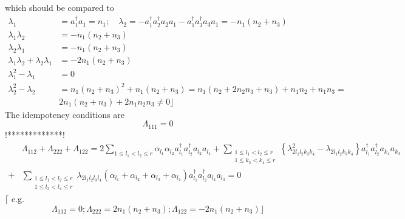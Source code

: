 \documentclass[aps,preprint]{revtex4}%
\begin{document}
which should be compared to
\begin{align}
\lambda_{1}  &  =a_{1}^{\dagger}a_{1}=n_{1};\quad\lambda_{2}=-a_{1}^{\dagger
}a_{2}^{\dagger}a_{2}a_{1}-a_{1}^{\dagger}a_{3}^{\dagger}a_{3}a_{1}%
=-n_{1}\left(  n_{2}+n_{3}\right) \nonumber\\
\lambda_{1}\lambda_{2}  &  =-n_{1}\left(  n_{2}+n_{3}\right) \nonumber\\
\lambda_{2}\lambda_{1}  &  =-n_{1}\left(  n_{2}+n_{3}\right) \nonumber\\
\lambda_{1}\lambda_{2}+\lambda_{2}\lambda_{1}  &  =-2n_{1}\left(  n_{2}%
+n_{3}\right) \nonumber\\
\lambda_{1}^{2}-\lambda_{1}  &  =0\nonumber\\
\lambda_{2}^{2}-\lambda_{2}  &  =n_{1}\left(  n_{2}+n_{3}\right)  ^{2}%
+n_{1}\left(  n_{2}+n_{3}\right)  =n_{1}\left(  n_{2}+2n_{2}n_{3}%
+n_{3}\right)  +n_{1}n_{2}+n_{1}n_{3}=\nonumber\\
&  2n_{1}\left(  n_{2}+n_{3}\right)  +2n_{1}n_{2}n_{3}\neq0\rfloor
\end{align}
The idempotency conditions are
\begin{equation}
\Lambda_{111}=0
\end{equation}
!*************!%
\begin{align}
&  \Lambda_{112}+\Lambda_{222}+\Lambda_{122}=2\sum_{1\leq l_{1}<l_{2}\leq
r}\alpha_{l_{1}}\alpha_{l_{2}}a_{l_{1}}^{\dagger}a_{l_{2}}^{\dagger}a_{l_{2}%
}a_{l_{1}}+\sum_{\substack{1\leq l_{1}<l_{2}\leq r\\1\leq k_{3}<k_{4}\leq
r}}\left\{  \lambda_{2l_{1}l_{2}k_{3}k_{4}}^{2}-\lambda_{2l_{1}l_{2}k_{3}%
k_{4}}\right\}  a_{l_{1}}^{\dagger}a_{l_{2}}^{\dagger}a_{k_{4}}a_{k_{3}}\\
+  &  \sum_{\substack{1\leq l_{1}<l_{2}\leq r\\1\leq l_{3}<l_{4}\leq
r}}\lambda_{2l_{1}l_{2}l_{3}l_{4}}\left(  \alpha_{l_{1}}+\alpha_{l_{2}}%
+\alpha_{l_{3}}+\alpha_{l_{4}}\right)  a_{l_{1}}^{\dagger}a_{l_{2}}^{\dagger
}a_{l_{4}}a_{l_{3}}=0
\end{align}
$\lceil$ e.g.%
\begin{equation}
\Lambda_{112}=0;\Lambda_{222}=2n_{1}\left(  n_{2}+n_{3}\right)  ;\Lambda
_{122}=-2n_{1}\left(  n_{2}+n_{3}\right)  \rfloor
\end{equation}%
\end{document}
